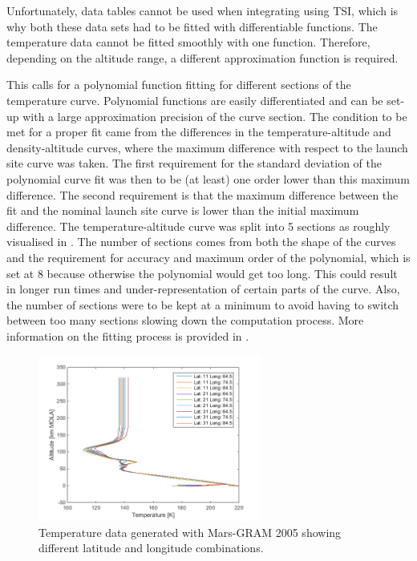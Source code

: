 Unfortunately, data tables cannot be used when integrating using \ac{TSI}, which is why both these data sets had to be fitted with differentiable functions. The temperature data cannot be fitted smoothly with one function.  Therefore, depending on the altitude range, a different approximation function is required. 

This calls for a polynomial function fitting for different sections of the temperature curve. Polynomial functions are easily differentiated and can be set-up with a large approximation precision of the curve section. The condition to be met for a proper fit came from the differences in the temperature-altitude and density-altitude curves, where the maximum difference with respect to the launch site curve was taken. The first requirement for the standard deviation of the polynomial curve fit was then to be (at least) one order lower than this maximum difference. The second requirement is that the maximum difference between the fit and the nominal launch site curve is lower than the initial maximum difference. The temperature-altitude curve was split into 5 sections as roughly visualised in . The number of sections comes from both the shape of the curves and the requirement for accuracy and maximum order of the polynomial, which is set at 8 because otherwise the polynomial would get too long. This could result in longer run times and under-representation of certain parts of the curve. Also, the number of sections were to be kept at a minimum to avoid having to switch between too many sections slowing down the computation process. More information on the fitting process is provided in .


\begin{figure}[H]
\centering
\includegraphics[width=0.65\textwidth]{figures/software/temperatureData.png}
\caption{Temperature data generated with Mars-\ac{GRAM} 2005 showing different latitude and longitude combinations.}
\label{fig:temperatureData}
\end{figure}

